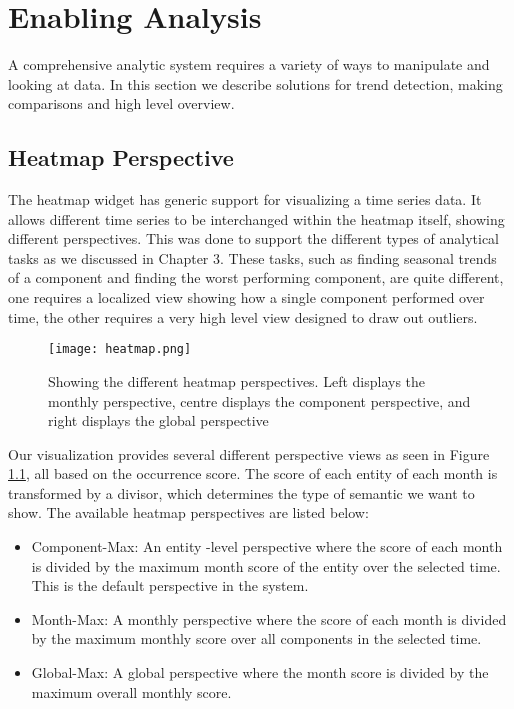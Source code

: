 %
\chapter{Enabling Analysis}
A comprehensive analytic system requires a variety of ways to manipulate and
looking at data. In this section we describe solutions for trend detection,
making comparisons and high level overview.
 

\section{Heatmap Perspective}
The heatmap widget has generic support for visualizing a time series data. It 
allows different time series to be interchanged within the heatmap itself, showing 
different perspectives. This was done to support the different types of
analytical tasks as we discussed in Chapter 3. These tasks, such as
finding seasonal trends of a component and finding the worst performing
component, are quite different, one requires a localized view showing how a
single component performed over time, the other requires a very high level view
designed to draw out outliers.

	\begin{figure}
	 \centering  
	 \texttt{[image: heatmap.png]}
	 \caption[Heatmap Perspectives]{Showing the different heatmap perspectives. Left
	 displays the monthly perspective, centre displays the component perspective, and right displays the
	 global perspective}
	 \label{figure:heatmap}
	\end{figure}


Our visualization provides several different perspective views as seen in
Figure \ref{figure:heatmap}, all based on the occurrence score. The score of
each entity of each month is transformed by a divisor, which determines the
type of semantic we want to show. The available heatmap perspectives are listed below:

\begin{itemize} [noitemsep]
  \item Component-Max: An entity -level perspective where the score of
  each month is divided by the maximum month score of the entity over the
  selected time. This is the default perspective in the system.
  
  \item Month-Max: A monthly perspective where the score of each month is 
  divided by the maximum monthly score over all components in the selected time.
  
  \item Global-Max: A global perspective where the month score is divided by the
  maximum overall monthly score.
\end{itemize}
 
